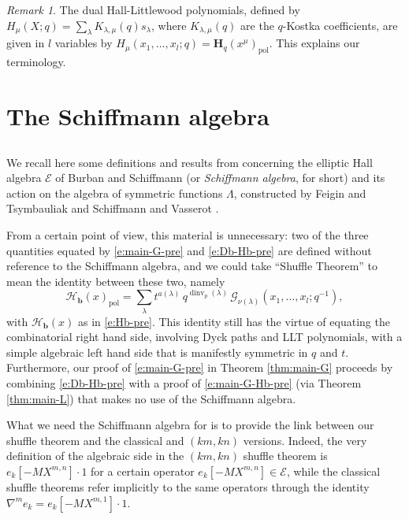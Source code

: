 \documentclass[12pt]{amsart}
\theoremstyle{definition}
\theoremstyle{remark}
\newtheorem{remark}[thm]{Remark}
\newcommand{\bb}{{\mathbf b}}
\newcommand{\Hbold}{{\mathbf H}}
\newcommand{\Ecal}{{\mathcal E}}
\newcommand{\Gcal}{{\mathcal G}}
\newcommand{\Hcat}{{\mathcal H}}  %
\DeclareMathOperator{\dinv}{dinv}
\DeclareMathOperator{\pol}{pol}
\begin{document}
\begin{remark}\label{rem:HL-pols}
The dual Hall-Littlewood polynomials, defined by $H_{\mu }(X;q) = \sum
_{\lambda }K_{\lambda ,\mu }(q) s_{\lambda }$, where $K_{\lambda ,\mu
}(q)$ are the $q$-Kostka coefficients, are given in $l$ variables by
$H_{\mu }(x_{1},\ldots,x_{l};q) = \Hbold _{q}(x^{\mu })_{\pol }$.
This explains our terminology.
\end{remark}

\section{The Schiffmann algebra}
\label{s:schiffmann}

\subsection{}
\label{ss:schiffmann}

We recall here some definitions and results from
\cite{BurbSchi12,FeigTsym11,Negut14,Schiffmann12,SchiVass13}
concerning the elliptic Hall algebra $\Ecal $ of Burban and Schiffmann
\cite{BurbSchi12} (or {\em Schiffmann algebra}, for short) and its
action on the algebra of symmetric functions $\Lambda $, constructed
by Feigin and Tsymbauliak \cite{FeigTsym11} and Schiffmann and
Vasserot \cite{SchiVass13}.

From a certain point of view, this material is unnecessary: two of the
three quantities equated by \eqref{e:main-G-pre} and \eqref{e:Db-Hb-pre} are 
defined without reference to the Schiffmann algebra, and we
could take ``Shuffle Theorem'' to mean the
identity between these two, namely
\begin{equation}\label{e:main-G-Hb-pre}
\Hcat _{\bb }(x)_{\pol} = \sum _{\lambda } t^{a(\lambda )}\, q^{\dinv
_{p}(\lambda )}\, \Gcal _{\nu (\lambda )}(x_{1},\ldots,x_{l}; q^{-1}),
\end{equation}
with $\Hcat _{\bb }(x)$ as in \eqref{e:Hb-pre}.  This identity still
has the virtue of equating the combinatorial right hand side,
involving Dyck paths and LLT polynomials, with a simple algebraic left
hand side that is manifestly symmetric in $q$ and $t$.  Furthermore,
our proof of \eqref{e:main-G-pre} in Theorem \ref{thm:main-G} proceeds
by combining \eqref{e:Db-Hb-pre} with a proof of
\eqref{e:main-G-Hb-pre} (via Theorem \ref{thm:main-L}) that makes no
use of the Schiffmann algebra.

What we need the Schiffmann algebra for is to provide the link between
our shuffle theorem and the classical and $(km,kn)$ versions.  Indeed,
the very definition of the algebraic side in the $(km,kn)$ shuffle
theorem is $e_{k}[-MX^{m,n}]\cdot 1$ for a certain operator
$e_{k}[-MX^{m,n}]\in \Ecal $, while the classical shuffle theorems
refer implicitly to the same operators through the identity $\nabla
^{m} e_{k} = e_{k}[-MX^{m,1}]\cdot 1$.
\end{document}
